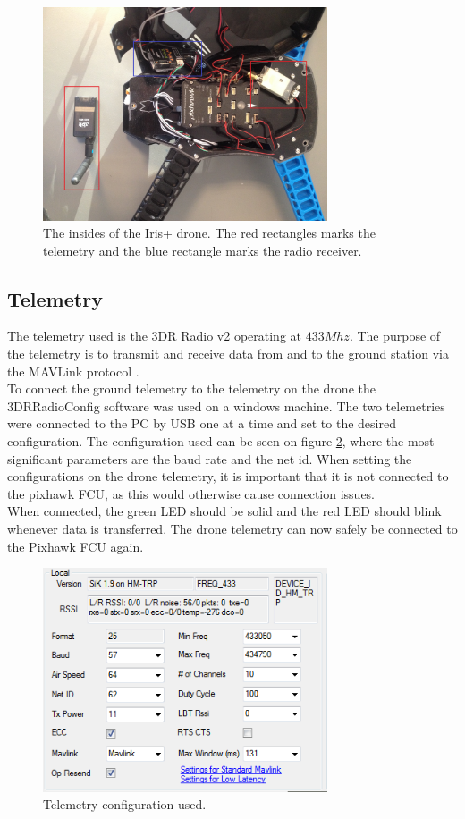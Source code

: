 \begin{figure}[H]
  \centering
    \includegraphics[width=0.75\textwidth]{./Images/insideIRIS}
\caption{The insides of the Iris+ drone. The red rectangles marks the telemetry and the blue
rectangle marks the radio receiver.}
  \label{fig:irisInside}
\end{figure}

\subsection*{Telemetry}
The telemetry used is the 3DR Radio v2 \cite{Ref:Telem} operating at $433 Mhz$. The purpose of the
telemetry is to transmit and receive data from and to the ground station via the MAVLink protocol
\cite{Ref:MAVLink}.\\
To connect the ground telemetry to the telemetry on the drone the 3DRRadioConfig software was used on a
windows machine. The two telemetries were connected to the PC by USB one at a time and set to the
desired configuration. The configuration used can be seen on figure \ref{fig:telem}, where the most
significant parameters are the baud rate and the net id. When setting the configurations on the drone
telemetry, it is important that it is not connected to the pixhawk FCU, as this would otherwise cause connection issues.\\
When connected, the green LED should be solid and the red LED should blink whenever data is
transferred. The drone telemetry can now safely be connected to the Pixhawk FCU again.

\begin{figure}[H]
  \centering
    \includegraphics[width=0.75\textwidth]{./Images/telem}
  \caption{Telemetry configuration used.}
  \label{fig:telem}
\end{figure}

